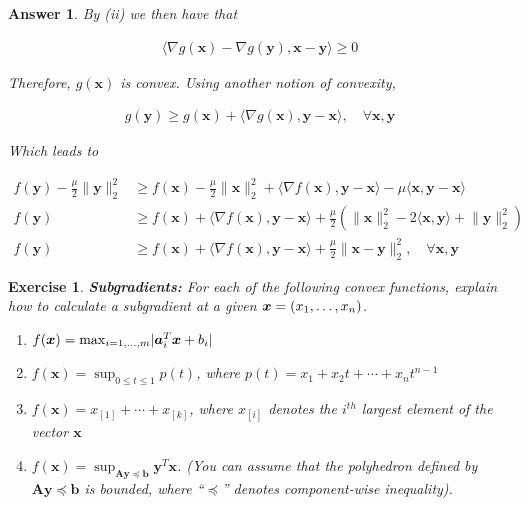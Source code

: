 \documentclass[12pt]{article}
\theoremstyle{colon}
\newtheorem{exercise}{Exercise}
\newtheorem*{answer}{Answer}
\begin{document}
\begin{answer}
  By (ii) we then have that 

  \begin{gather*}
    \langle \nabla g(\bm{x}) - \nabla g(\bm{y}), \bm{x} - \bm{y} \rangle \geq 0
  \end{gather*}

  Therefore, $g(\bm{x})$ is convex. Using another notion of convexity,

  \begin{gather*}
    g(\bm{y}) \geq g(\bm{x}) + \langle \nabla g(\bm{x}), \bm{y} - \bm{x} \rangle, \quad \forall \bm{x}, \bm{y}
  \end{gather*}

  Which leads to

  \begin{align*}
    f(\bm{y}) - \frac{\mu}{2} \lVert \bm{y} \rVert_2^2 &\geq f(\bm{x}) - \frac{\mu}{2} \lVert \bm{x} \rVert_2^2 + \langle \nabla f(\bm{x}), \bm{y} - \bm{x} \rangle - \mu \langle \bm{x}, \bm{y} - \bm{x} \rangle \\
    f(\bm{y}) &\geq f(\bm{x}) + \langle \nabla f(\bm{x}), \bm{y} - \bm{x} \rangle + \frac{\mu}{2} (\lVert \bm{x} \rVert_2^2 - 2 \langle \bm{x}, \bm{y} \rangle + \lVert \bm{y} \rVert_2^2 ) \\
    f(\bm{y}) &\geq f(\bm{x}) + \langle \nabla f(\bm{x}), \bm{y} - \bm{x} \rangle + \frac{\mu}{2} \lVert \bm{x} - \bm{y} \rVert_2^2, \quad \forall \bm{x}, \bm{y}
  \end{align*}

\end{answer}

\clearpage

\begin{exercise}
  \textbf{Subgradients:} For each of the following convex functions, explain how to calculate a subgradient at a given $\bm{x} = (x_1, \mathellipsis, x_n)$.

  \begin{enumerate}[label=\alph*)]
    \item $f(\bm{x}) = \max_{i = 1, \mathellipsis, m} \lvert \bm{a}_i^T \bm{x} + b_i \rvert$
    \item $f(\bm{x}) = \sup_{0 \leq t \leq 1} p(t)$, where $p(t) = x_1 + x_2 t + \cdots + x_n t^{n-1}$
    \item $f(\bm{x}) = x_{[1]} + \cdots + x_{[k]}$, where $x_{[i]}$ denotes the $i^{th}$ largest element of the vector $\bm{x}$
    \item $f(\bm{x}) = \sup_{\bm{A} \bm{y} \preceq \bm{b}} \bm{y}^T \bm{x}$. (You can assume that the polyhedron defined by $\bm{A} \bm{y} \preceq \bm{b}$ is bounded, where ``$\preceq$'' denotes component-wise inequality).
  \end{enumerate}
\end{exercise}
\end{document}
